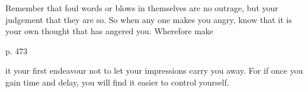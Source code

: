 Remember  that foul  words or  blows  in themselves  are no  outrage, but  your
judgement that they  are so. So when any  one makes you angry, know  that it is
your own thought that has angered you. Wherefore make

p. 473

it your first endeavour not to let your impressions carry you away. For if once
you gain time and delay, you will find it easier to control yourself.
